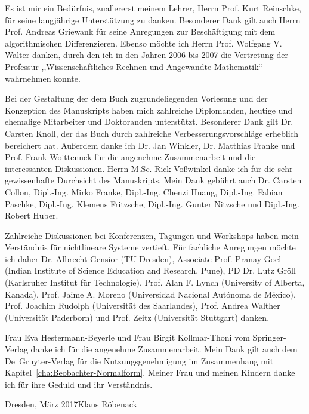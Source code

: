 Es ist mir ein Bedürfnis, zuallererst meinem Lehrer, Herrn Prof. Kurt
Reinschke, für seine langjährige Unterstützung zu danken. Besonderer
Dank gilt auch Herrn Prof. Andreas Griewank für seine Anregungen zur
Beschäftigung mit dem algorithmischen Differenzieren. Ebenso möchte
ich Herrn Prof. Wolfgang V. Walter danken, durch den ich in den Jahren
2006 bis 2007 die Vertretung der Professur ,,Wissenschaftliches Rechnen
und Angewandte Mathematik`` wahrnehmen konnte.

Bei der Gestaltung der dem Buch zugrundeliegenden Vorlesung und der
Konzeption des Manuskripts haben mich zahlreiche Diplomanden, heutige
und ehemalige Mitarbeiter und Doktoranden unterstützt. Besonderer
Dank gilt Dr. Carsten Knoll, der das Buch durch zahlreiche Verbesserungsvorschläge
erheblich bereichert hat. Außerdem danke ich Dr. Jan Winkler, Dr.
Matthias Franke und Prof. Frank Woittennek für die angenehme Zusammenarbeit
und die interessanten Diskussionen. Herrn M.Sc. Rick Voßwinkel danke
ich für die sehr gewissenhafte Durchsicht des Manuskripts. Mein Dank
gebührt auch Dr. Carsten Collon, Dipl.-Ing. Mirko Franke, Dipl.-Ing.
Chenzi Huang, Dipl.-Ing. Fabian Paschke, Dipl.-Ing. Klemens Fritzsche,
Dipl.-Ing. Gunter Nitzsche und Dipl.-Ing. Robert Huber.

Zahlreiche Diskussionen bei Konferenzen, Tagungen und Workshops haben
mein Verständnis für nichtlineare Systeme vertieft. Für fachliche
Anregungen möchte ich daher Dr. Albrecht Gensior (TU Dresden), Associate
Prof. Pranay Goel (Indian Institute of Science Education and Research,
Pune), PD Dr. Lutz Gröll (Karlsruher Institut für Technologie), Prof.
Alan F. Lynch (University of Alberta, Kanada), Prof. Jaime A. Moreno
(Universidad Nacional Autónoma de México), Prof. Joachim Rudolph (Universität
des Saarlandes), Prof. Andrea Walther (Universität Paderborn) und
Prof. Zeitz (Universität Stuttgart) danken.

Frau Eva Hestermann-Beyerle und Frau Birgit Kollmar-Thoni vom Springer-Verlag
danke ich für die angenehme Zusammenarbeit. Mein Dank gilt auch dem
\hbox{De~Gruyter}-Verlag für die Nutzungsgenehmigung im Zusammenhang
mit Kapitel~\ref{cha:Beobachter-Normalform}. Meiner Frau und meinen
Kindern danke ich für ihre Geduld und ihr Verständnis.

\vspace{\baselineskip}

\noindent \begin{flushright}
Dresden, März 2017\hfill{}Klaus Röbenack
\par\end{flushright}
